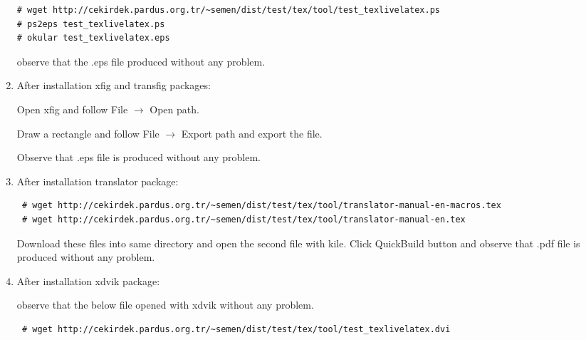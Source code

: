 \documentclass[a4paper,10pt]{article}
\begin{document}
\begin{enumerate}
\begin{verbatim}
# wget http://cekirdek.pardus.org.tr/~semen/dist/test/tex/tool/test_texlivelatex.ps
# ps2eps test_texlivelatex.ps
# okular test_texlivelatex.eps
\end{verbatim}

observe that the .eps file produced without any problem.
\item After installation xfig and transfig packages:

Open xfig and follow File $\rightarrow$ Open path.

Draw a rectangle and follow File $\rightarrow$ Export path and export the file.

Observe that .eps file is produced without any problem.

\item After installation translator package:
\begin{verbatim}
 # wget http://cekirdek.pardus.org.tr/~semen/dist/test/tex/tool/translator-manual-en-macros.tex
 # wget http://cekirdek.pardus.org.tr/~semen/dist/test/tex/tool/translator-manual-en.tex
\end{verbatim}

Download these files into same directory and open the second file with kile. Click QuickBuild button and observe that .pdf file is produced without any problem.

\item After installation xdvik package:

observe that the below file opened with xdvik without any problem.
\begin{verbatim}
 # wget http://cekirdek.pardus.org.tr/~semen/dist/test/tex/tool/test_texlivelatex.dvi
 \end{verbatim}

\end{enumerate}
\end{document}

